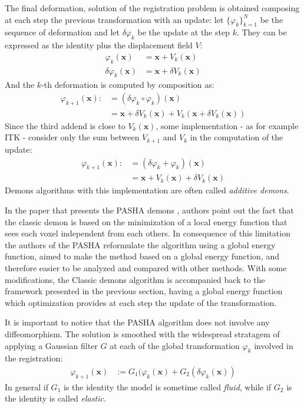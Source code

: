 The final deformation, solution of the registration problem is obtained composing at each step the previous transformation with an update: let $\{\varphi_{k}\}_{k=1}^{N}$ be the sequence of deformation and let $\delta \varphi_{k}$ be the update at the step $k$. They can be expressed as the identity plus the displacement field $V$:
\begin{align*}
	\varphi_{k}(\mathbf{x}) &= \mathbf{x} + V_{k}(\mathbf{x}) \\ 
	\delta \varphi_{k}(\mathbf{x}) &= \mathbf{x} + \delta V_{k}(\mathbf{x}) 
\end{align*}
And the $k$-th deformation is computed by composition as:
\begin{align*}
\varphi_{k+1}(\mathbf{x})  :&= (\delta \varphi_{k}\circ \varphi_{k})(\mathbf{x}) \\
&= \mathbf{x} + \delta V_{k}(\mathbf{x}) + V_{k}(\mathbf{x} + \delta V_{k}(\mathbf{x}))
\end{align*}
Since the third addend is close to $V_{k}(\mathbf{x})$, some implementation - as for example ITK - consider only the sum between 
$ V_{k+1}$ and $V_{k}$ in the computation of the update:
\begin{align*}
\varphi_{k+1}(\mathbf{x})  :&= (\delta \varphi_{k} + \varphi_{k})(\mathbf{x}) \\
&= \mathbf{x} + V_{k}(\mathbf{x}) + \delta V_{k}(\mathbf{x})
\end{align*}
Demons algorithms with this implementation are often called \emph{additive demons}.

In the paper that presents the PASHA demons \cite{cachier2003iconic}, authors point out the fact that the classic demon is based on the minimization of a local energy function that sees each voxel independent from each others. In consequence of this limitation the authors of the PASHA reformulate the algorithm using a global energy function, aimed to make the method based on a global energy function, and therefore easier to be analyzed and compared with other methods. With some modifications, the Classic demons algorithm is accompanied back to the framework presented in the previous section, having a global energy function which optimization provides at each step the update of the transformation. 

It is important to notice that the PASHA algorithm does not involve any diffeomorphism. The solution is smoothed with the widespread stratagem of applying a Gaussian filter $G$ at each of the global transformation $\varphi_{k}$ involved in the registration:
\begin{align*}
\varphi_{k+1}(\mathbf{x})  &:= G_{1}(\varphi_{k}(\mathbf{x}) + G_{2}(\delta \varphi_{k}(\mathbf{x}))
\end{align*}
In general if $G_{1}$ is the identity the model is sometime called \emph{fluid}, while if $G_{2}$ is the identity is called \emph{elastic}.

